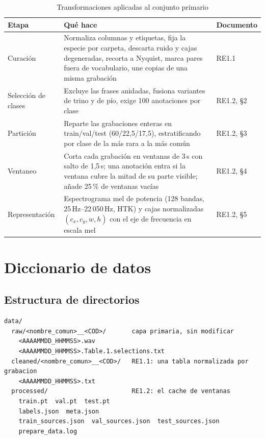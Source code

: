 \documentclass[12pt,a4paper]{article}
\begin{document}
\begin{table}[htbp]
    \centering
    \caption{Transformaciones aplicadas al conjunto primario}
    \label{tab:transformaciones}
    \small
    \begin{tabular}{@{}L{3.2cm}L{7.6cm}L{2.6cm}@{}}
        \toprule
        \textbf{Etapa} & \textbf{Qué hace} & \textbf{Documento} \\
        \midrule
        Curación & Normaliza columnas y etiquetas, fija la especie por carpeta, descarta ruido y cajas degeneradas, recorta a Nyquist, marca pares fuera de vocabulario, une copias de una misma grabación & RE1.1 \\
        \addlinespace
        Selección de clases & Excluye las frases anidadas, fusiona variantes de trino y de pío, exige 100 anotaciones por clase & RE1.2, §2 \\
        \addlinespace
        Partición & Reparte las grabaciones enteras en train/val/test (60/22,5/17,5), estratificando por clase de la más rara a la más común & RE1.2, §3 \\
        \addlinespace
        Ventaneo & Corta cada grabación en ventanas de 3\,s con salto de 1,5\,s; una anotación entra si la ventana cubre la mitad de su parte visible; añade 25\,\% de ventanas vacías & RE1.2, §4 \\
        \addlinespace
        Representación & Espectrograma mel de potencia (128 bandas, 25\,Hz--22\,050\,Hz, HTK) y cajas normalizadas $(c_x, c_y, w, h)$ con el eje de frecuencia en escala mel & RE1.2, §5 \\
        \bottomrule
    \end{tabular}
\end{table}

\section{Diccionario de datos}

\subsection{Estructura de directorios}

\noindent\begin{minipage}{\textwidth}
\begin{lstlisting}
data/
  raw/<nombre_comun>__<COD>/       capa primaria, sin modificar
    <AAAAMMDD_HHMMSS>.wav
    <AAAAMMDD_HHMMSS>.Table.1.selections.txt
  cleaned/<nombre_comun>__<COD>/   RE1.1: una tabla normalizada por grabacion
    <AAAAMMDD_HHMMSS>.txt
  processed/                       RE1.2: el cache de ventanas
    train.pt  val.pt  test.pt
    labels.json  meta.json
    train_sources.json  val_sources.json  test_sources.json
    prepare_data.log
\end{lstlisting}
\end{minipage}
\end{document}
